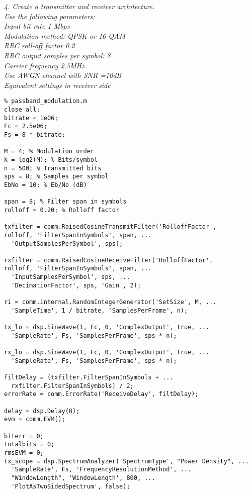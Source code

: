\documentclass[a4paper]{article}
\begin{document}
\newpage
\textit{4. Create a transmitter and receiver architecture.\\
Use the following parameters:\\
Input bit rate 1 Mbps\\
Modulation method: QPSK or 16-QAM\\
RRC roll-off factor 0.2\\
RRC output samples per symbol: 8\\
Carrier frequency 2.5MHz\\
Use AWGN channel with SNR =10dB\\
Equivalent settings in receiver side}\\
\bigskip
{}
\begin{verbatim}
% passband_modulation.m
close all;
bitrate = 1e06;
Fc = 2.5e06;
Fs = 8 * bitrate;

M = 4; % Modulation order
k = log2(M); % Bits/symbol
n = 500; % Transmitted bits
sps = 8; % Samples per symbol
EbNo = 10; % Eb/No (dB)

span = 8; % Filter span in symbols
rolloff = 0.20; % Rolloff factor

txfilter = comm.RaisedCosineTransmitFilter('RolloffFactor',
rolloff, 'FilterSpanInSymbols', span, ...
  'OutputSamplesPerSymbol', sps);

rxfilter = comm.RaisedCosineReceiveFilter('RolloffFactor',
rolloff, 'FilterSpanInSymbols', span, ...
  'InputSamplesPerSymbol', sps, ...
  'DecimationFactor', sps, 'Gain', 2);

ri = comm.internal.RandomIntegerGenerator('SetSize', M, ...
  'SampleTime', 1 / bitrate, 'SamplesPerFrame', n);

tx_lo = dsp.SineWave(1, Fc, 0, 'ComplexOutput', true, ...
  'SampleRate', Fs, 'SamplesPerFrame', sps * n);

rx_lo = dsp.SineWave(1, Fc, 0, 'ComplexOutput', true, ...
  'SampleRate', Fs, 'SamplesPerFrame', sps * n);

filtDelay = (txfilter.FilterSpanInSymbols + ...
  rxfilter.FilterSpanInSymbols) / 2;
errorRate = comm.ErrorRate('ReceiveDelay', filtDelay);

delay = dsp.Delay(8);
evm = comm.EVM();

biterr = 0;
totalbits = 0;
rmsEVM = 0;
tx_scope = dsp.SpectrumAnalyzer('SpectrumType', "Power Density", ...
  'SampleRate', Fs, 'FrequencyResolutionMethod', ...
  "WindowLength", 'WindowLength', 800, ...
  'PlotAsTwoSidedSpectrum', false);


\end{verbatim}
\end{document}
